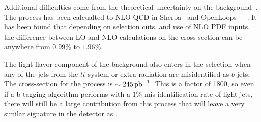 \par Additional difficulties come from the theoretical uncertainty on
the \ttbb background~\cite{th:HiggsXS_2013}.  The process has been
calcualted to NLO QCD in Sherpa~\cite{tthXS_sherpa_Gleisberg} and
OpenLoops~\cite{ttbbXS_openloops_Cascioli}~\cite{ttbbXS_openloops_help1_Krauss}~\cite{ttbbXS_openloops_help2_Gleisberg}.
It has been found that depending on selection cuts, and use of NLO PDF
inputs, the difference between LO and NLO calculations on the cross
section can be anywhere from $0.99\%$ to $1.96\%$.  

\par The light flavor component of the \ttjets background also enters
in the selection when any of the jets from the $t\bar{t}$ system or
extra radiation are misidentified as $b$-jets.  The cross-section for
the \ttjets process is $\sim245\mbox{\ensuremath{\,\text{pb}^\text{$-$1}}}$.  This is a factor of 1800, so
even if a b-tagging algorithm performs with a $1\%$ mis-identification
rate of light-jets, there will still be a large contribution from this
process that will leave a very similar signature in the detector as
\ttH. 

